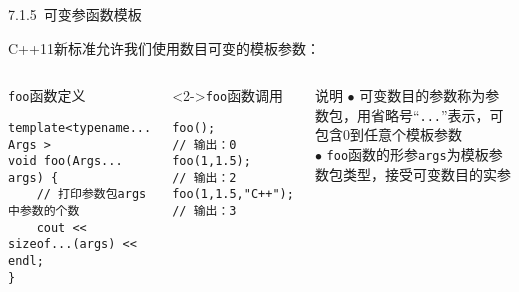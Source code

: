 \begin{frame}[fragile]{7.1.5~可变参函数模板}

C++11新标准允许我们使用\alert{数目可变}的模板参数：

\vspace{-4mm}

\begin{columns}[t]

\begin{blueblock}{\texttt{foo}函数定义}
\begin{lstlisting}[moreemph={T}]
template<typename... Args >
void foo(Args... args) {
    // 打印参数包args中参数的个数
    cout << sizeof...(args) << endl;
}
\end{lstlisting}
\end{blueblock}
\begin{blueblock}<2->{\texttt{foo}函数调用}
\begin{lstlisting}[moreemph={T}]
foo();                  // 输出：0
foo(1,1.5);             // 输出：2
foo(1,1.5,"C++");       // 输出：3
\end{lstlisting}
\end{blueblock}

\begin{yellowblock}{说明}
$\bullet$ 可变数目的参数称为\alert{参数包}，用省略号“\alert{\texttt{...}}”表示，可包含0到任意个模板参数\\
$\bullet$ \texttt{foo}函数的形参\texttt{args}为模板参数包类型，接受可变数目的实参
\end{yellowblock}
\end{columns}
\end{frame}


